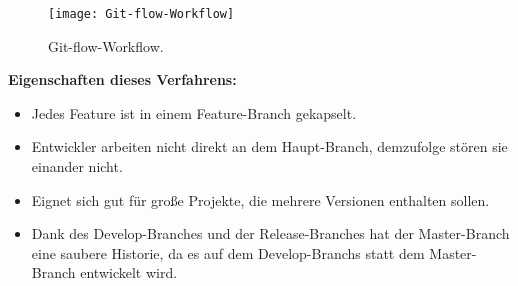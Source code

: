 \begin{figure}[htbp]
	\centering
	\texttt{[image: Git-flow-Workflow]}
	\caption[Git-flow-Workflow]{Git-flow-Workflow.\\ \cite{Git-flow-Workflow}}
	\label{fig:Git-flow-Workflow}
\end{figure}
	
\textbf{Eigenschaften dieses Verfahrens:}
\begin{itemize}
	\item Jedes Feature ist in einem Feature-Branch gekapselt.
	\item Entwickler arbeiten nicht direkt an dem Haupt-Branch, demzufolge stören sie einander nicht.
	\item Eignet sich gut für große Projekte, die mehrere Versionen enthalten sollen.
	\item Dank des Develop-Branches und der Release-Branches hat der Master-Branch eine saubere Historie, da es auf dem Develop-Branchs statt dem Master-Branch entwickelt wird.
\end{itemize}


